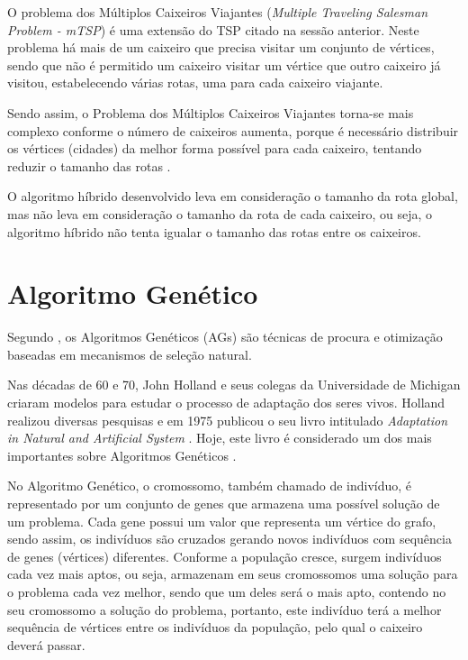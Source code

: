 \documentclass[12pt,openright,a4paper,oneside]{tcc}
\begin{document}
		O problema dos Múltiplos Caixeiros Viajantes (\textit{Multiple Traveling Salesman Problem - mTSP}) é uma extensão do TSP citado na sessão anterior.
		Neste problema há mais de um caixeiro que precisa visitar um conjunto de vértices, sendo que não é permitido um caixeiro visitar um vértice que outro caixeiro já visitou, estabelecendo várias rotas, uma para cada caixeiro viajante.

		Sendo assim, o Problema dos Múltiplos Caixeiros Viajantes torna-se  mais complexo conforme o número de caixeiros aumenta, porque é necessário distribuir os vértices (cidades) da melhor forma possível para cada caixeiro, tentando reduzir o tamanho das rotas \cite{dissertation}. 

		O algoritmo híbrido desenvolvido leva em consideração o tamanho da rota global, mas não leva em consideração o tamanho da rota de cada caixeiro, ou seja, o algoritmo híbrido não tenta igualar o tamanho das rotas entre os caixeiros.
	
	\chapter{Algoritmo Genético}

		Segundo , os Algoritmos Genéticos (AGs) são técnicas de procura e otimização baseadas em mecanismos de seleção natural. 

		Nas décadas de 60 e 70, John Holland e seus colegas da Universidade de Michigan criaram modelos para estudar o processo de adaptação dos seres vivos. Holland realizou diversas pesquisas e em 1975 publicou o seu livro intitulado \textit{Adaptation in Natural and Artificial System} \cite{john}. Hoje, este livro é considerado um dos mais importantes sobre Algoritmos Genéticos \cite{0001-pdf}.

		No Algoritmo Genético, o cromossomo, também chamado de indivíduo, é representado por um conjunto de genes que armazena uma possível solução de um problema. Cada gene possui um valor que representa um vértice do grafo, sendo assim, os indivíduos são cruzados gerando novos indivíduos com sequência de genes (vértices) diferentes. Conforme a população cresce, surgem indivíduos cada vez mais aptos, ou seja, armazenam em seus cromossomos uma solução para o problema cada vez melhor, sendo que um deles será o mais apto, contendo no seu cromossomo a solução do problema, portanto, este indivíduo terá a melhor sequência de vértices entre os indivíduos da população, pelo qual o caixeiro deverá passar.
\end{document}
